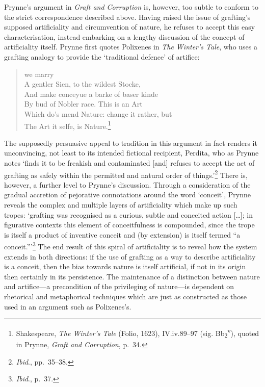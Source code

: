 \documentclass[]{article}
\begin{document}
Prynne’s argument in \emph{Graft and Corruption} is, however, too subtle
to conform to the strict correspondence described above. Having raised
the issue of grafting’s supposed artificiality and circumvention of
nature, he refuses to accept this easy characterisation, instead
embarking on a lengthy discussion of the concept of artificiality
itself. Prynne first quotes Polixenes in \emph{The Winter’s Tale}, who
uses a grafting analogy to provide the ‘traditional defence’ of
artifice:

\begin{quote}
\singlespacing \hspace{100pt} we marry\\
A gentler Sien, to the wildest Stocke,\\
And make conceyue a barke of baser kinde\\
By bud of Nobler race. This is an Art\\
Which do’s mend Nature: change it rather, but\\
The Art it selfe, is Nature.\footnote{Shakespeare, \emph{The Winter’s
  Tale} (Folio, 1623), IV.iv.89–97 (sig.
  Bb\textsubscript{2}\textsuperscript{v}), quoted in Prynne, \emph{Graft
  and Corruption}, p.~34.}
\end{quote}

\noindent The supposedly persuasive appeal to tradition in this argument
in fact renders it unconvincing, not least to its intended fictional
recipient, Perdita, who as Prynne notes ‘finds it to be freakish and
contaminated {[}and{]} refuses to accept the act of grafting as safely
within the permitted and natural order of things.’\footnote{\emph{Ibid}.,
  pp.~35–38.} There is, however, a further level to Prynne’s discussion.
Through a consideration of the gradual accretion of pejorative
connotations around the word ‘conceit’, Prynne reveals the complex and
multiple layers of artificiality which make up such tropes: ‘grafting
was recognised as a curious, subtle and conceited action {[}\ldots{}{]};
in figurative contexts this element of conceitfulness is compounded,
since the trope is itself a product of inventive conceit and (by
extension) is itself termed “a conceit.”’\footnote{\emph{Ibid}., p.~37.}
The end result of this spiral of artificiality is to reveal how the
system extends in both directions: if the use of grafting as a way to
describe artificiality is a conceit, then the bias towards nature is
itself artificial, if not in its origin then certainly in its
persistence. The maintenance of a distinction between nature and
artifice—a precondition of the privileging of nature—is dependent on
rhetorical and metaphorical techniques which are just as constructed as
those used in an argument such as Polixenes’s.
\end{document}
